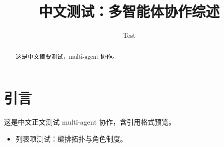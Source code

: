 \documentclass[acmsmall,nonacm]{acmart}
\begin{document}
\begin{abstract}
这是中文摘要测试，multi-agent 协作。
\end{abstract}
\title{中文测试：多智能体协作综述}
\author{Test}
\maketitle
\section{引言}
这是中文正文测试 multi-agent 协作，含引用格式预览。
\begin{itemize}
\item 列表项测试：编排拓扑与角色制度。
\end{itemize}
\end{document}
